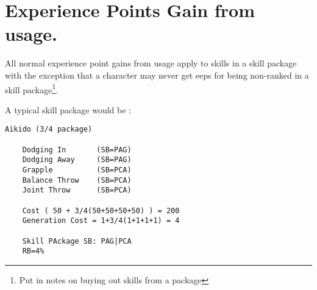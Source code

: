 \section{Experience Points Gain from usage.}

All normal experience point gains from usage apply to skills in a skill
package with the exception that a character may never get eeps for
being non-ranked in a skill package\footnote{Put in notes on buying 
out skills from a package}. 

A typical skill package would be :

\begin{verbatim}
Aikido (3/4 package)

	Dodging In       (SB=PAG)
	Dodging Away     (SB=PAG)
    Grapple	         (SB=PCA)
    Balance Throw    (SB=PCA)
    Joint Throw      (SB=PCA)

	Cost ( 50 + 3/4(50+50+50+50) ) = 200
    Generation Cost = 1+3/4(1+1+1+1) = 4

	Skill PAckage SB: PAG|PCA
	RB=4%

\end{verbatim}

